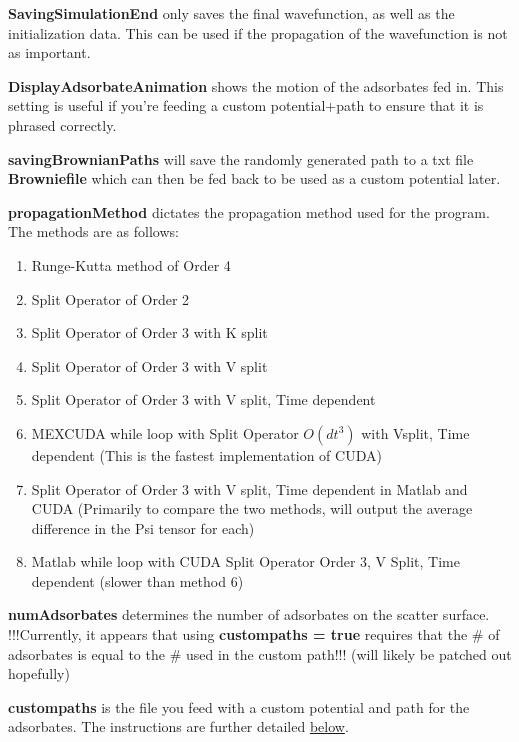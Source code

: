 \documentclass[11pt,letterpaper]{article}
\renewcommand{\\}{\bigskip}
\begin{document}
\textbf{SavingSimulationEnd} only saves the final wavefunction, as well as the initialization data. This can be used if the propagation of the wavefunction is not as important.\\

\textbf{DisplayAdsorbateAnimation} shows the motion of the adsorbates fed in. This setting is useful if you're feeding a custom potential+path to ensure that it is phrased correctly.\\

\textbf{savingBrownianPaths} will save the randomly generated path to a txt file \textbf{Browniefile} which can then be fed back to be used as a custom potential later.\\

\textbf{propagationMethod} dictates the propagation method used for the program. The methods are as follows:

\begin{enumerate}
    \item Runge-Kutta method of Order 4
    \item Split Operator of Order 2
    \item Split Operator of Order 3 with K split
    \item Split Operator of Order 3 with V split
    \item Split Operator of Order 3 with V split, Time dependent
    \item MEXCUDA while loop with Split Operator $O(dt^3)$ with Vsplit, Time dependent (This is the fastest implementation of CUDA)
    \item Split Operator of Order 3 with V split, Time dependent in Matlab and CUDA (Primarily to compare the two methods, will output the average difference in the Psi tensor for each)
    \item Matlab while loop with CUDA Split Operator Order 3, V Split, Time dependent (slower than method 6)
\end{enumerate}

\bigskip

\textbf{numAdsorbates} determines the number of adsorbates on the scatter surface. !!!Currently, it appears that using \textbf{custompaths = true} requires that the \# of adsorbates is equal to the \# used in the custom path!!! (will likely be patched out hopefully)\\

\textbf{custompaths} is the file you feed with a custom potential and path for the adsorbates. The instructions are further detailed \hyperref[sec:custompaths]{below}.\\
\end{document}
